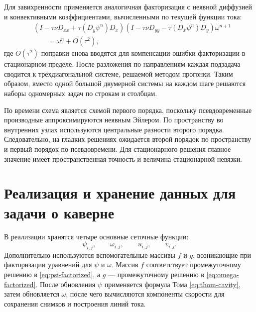 \documentclass[12pt,a4paper]{article}
\begin{document}
Для завихренности применяется аналогичная факторизация с неявной диффузией и конвективными коэффициентами, вычисленными по текущей функции тока:
\begin{equation}
\begin{aligned}
    &\left(I-\tau\nu D_{xx}
        +\tau(D_y\psi^n)D_x\right)
     \left(I-\tau\nu D_{yy}
        -\tau(D_x\psi^n)D_y\right)\omega^{n+1}
    \\
    &\qquad =
    \omega^n+O(\tau^2),
\end{aligned}
\label{eq:omega-factorized}
\end{equation}
где \(O(\tau^2)\)-поправки снова вводятся для компенсации ошибки факторизации в стационарном пределе.
После разложения по направлениям каждая подзадача сводится к трёхдиагональной системе, решаемой методом прогонки.
Таким образом, вместо одной большой двумерной системы на каждом шаге решаются наборы одномерных задач по строкам и столбцам.

По времени схема является схемой первого порядка, поскольку псевдовременные производные аппроксимируются неявным Эйлером.
По пространству во внутренних узлах используются центральные разности второго порядка.
Следовательно, на гладких решениях ожидается второй порядок по пространству и первый порядок по псевдовремени.
Для стационарного решения главное значение имеет пространственная точность и величина стационарной невязки.

\section{Реализация и хранение данных для задачи о каверне}

В реализации хранятся четыре основные сеточные функции:
\[
    \psi_{i,j},\qquad \omega_{i,j},\qquad u_{i,j},\qquad v_{i,j}.
\]
Дополнительно используются вспомогательные массивы \(f\) и \(g\), возникающие при факторизации уравнений для \(\psi\) и \(\omega\).
Массив \(f\) соответствует промежуточному решению в \eqref{eq:psi-factorized}, а \(g\) --- промежуточному решению в \eqref{eq:omega-factorized}.
После обновления \(\psi\) применяется формула Тома \eqref{eq:thom-cavity}, затем обновляется \(\omega\), после чего вычисляются компоненты скорости для сохранения снимков и построения линий тока.
\end{document}
